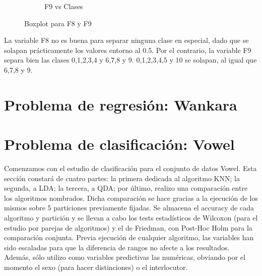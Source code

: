 \begin{itemize}
\begin{itemize}
\begin{figure}[H]
\begin{subfigure}{.5\textwidth}
				\caption{F9 vs Clases}
				\label{fig:bpmF9}
			\end{subfigure}
			\caption{Boxplot para F8 y F9}
			\label{fig:bpm89}
		\end{figure}
	
		La variable F8 no es buena para separar ninguna clase en especial, dado que se solapan prácticamente los valores entorno al 0.5. Por el contrario, la variable F9 separa bien las clases 0,1,2,3,4 y 6,7,8 y 9. 0,1,2,3,4,5 y 10 se solapan, al igual que 6,7,8 y 9.
	\end{itemize}

\end{itemize}

\newpage

\section{Problema de regresión: Wankara}




\newpage


\section{Problema de clasificación: Vowel}

Comenzamos con el estudio de clasificación para el conjunto de datos Vowel. Esta sección constará de cuatro partes: la primera dedicada al algoritmo KNN; la segunda, a LDA; la tercera, a QDA; por último, realizo una comparación entre los algoritmos nombrados. Dicha comparación se hace gracias a la ejecución de los mismos sobre 5 particiones previamente fijadas. Se almacena el accuracy de cada algoritmo y partición y se llevan a cabo los tests estadísticos de Wilcoxon (para el estudio por parejas de algoritmos) y el de Friedman, con Post-Hoc Holm para la comparación conjunta. Previa ejecución de cualquier algoritmo, las variables han sido escaladas para que la diferencia de rangos no afecte a los resultados. Además, sólo utilizo como variables predictivas las numéricas, obviando por el momento el sexo (para hacer distinciones) o el interlocutor.

